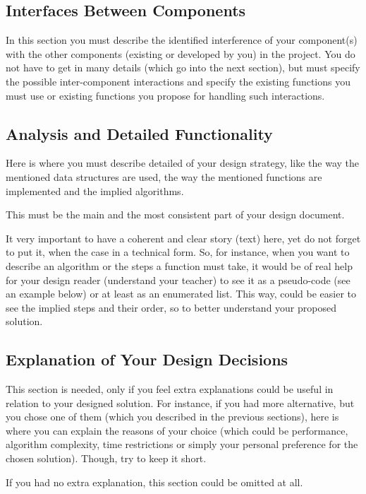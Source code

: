 \subsection{Interfaces Between Components}

In this section you must describe the identified interference of your component(s) with the other components (existing or developed by you) in the project. You do not have to get in many details (which go into the next section), but must specify the possible inter-component interactions and specify the existing functions you must use or existing functions you propose for handling such interactions. 


\subsection{Analysis and Detailed Functionality}
Here is where you must describe detailed of your design strategy, like the way the mentioned data structures are used, the way the mentioned functions are implemented and the implied algorithms. 

This must be the main and the most consistent part of your design document.

It very important to have a coherent and clear story (text) here, yet do not forget to put it, when the case in a technical form. So, for instance, when you want to describe an algorithm or the steps a function must take, it would be of real help for your design reader (understand your teacher) to see it as a pseudo-code (see an example below) or at least as an enumerated list. This way, could be easier to see the implied steps and their order, so to better understand your proposed solution.


\subsection{Explanation of Your Design Decisions}

This section is needed, only if you feel extra explanations could be useful in relation to your designed solution. For instance, if you had more alternative, but you chose one of them (which you described in the previous sections), here is where you can explain the reasons of your choice (which could be performance, algorithm complexity, time restrictions or simply your personal preference for the chosen solution). Though, try to keep it short. 

If you had no extra explanation, this section could be omitted at all. 


